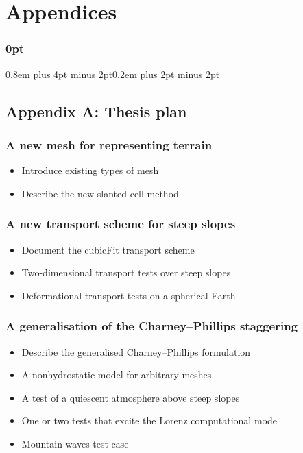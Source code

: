 \documentclass[a4paper,11pt]{article}
\begin{document}
                                                 


\newpage

\section*{Appendices}

\titlespacing\subsubsection{0pt}{0.8em plus 4pt minus 2pt}{0.2em plus 2pt minus 2pt}

\subsection*{Appendix A: Thesis plan}

\subsubsection*{A new mesh for representing terrain}
\begin{itemize}
	\setlength\itemsep{0.1em}
	\item Introduce existing types of mesh
	\item Describe the new slanted cell method
\end{itemize}

\subsubsection*{A new transport scheme for steep slopes}
\begin{itemize}
	\setlength\itemsep{0.1em}
	\item Document the cubicFit transport scheme
	\item Two-dimensional transport tests over steep slopes
	\item Deformational transport tests on a spherical Earth
\end{itemize}
	
\subsubsection*{A generalisation of the Charney--Phillips staggering}
\begin{itemize}
	\setlength\itemsep{0.1em}
	\item Describe the generalised Charney--Phillips formulation
	\item A nonhydrostatic model for arbitrary meshes
	\item A test of a quiescent atmosphere above steep slopes
	\item One or two tests that excite the Lorenz computational mode
	\item Mountain waves test case
\end{itemize}
\end{document}
